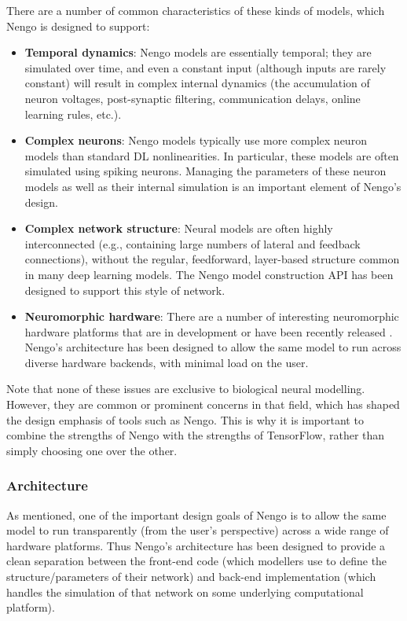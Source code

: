 \documentclass{article}
\begin{document}
There are a number of common characteristics of these kinds of models, which Nengo is designed to support:

\begin{itemize}
\item {\bf Temporal dynamics}: Nengo models are essentially temporal; they are simulated over time, and even a constant input (although inputs are rarely constant) will result in complex internal dynamics (the accumulation of neuron voltages, post-synaptic filtering, communication delays, online learning rules, etc.).
\item {\bf Complex neurons}: Nengo models typically use more complex neuron models than standard DL nonlinearities. In particular, these models are often simulated using spiking neurons.  Managing the parameters of these neuron models as well as their internal simulation is an important element of Nengo's design.
\item {\bf Complex network structure}: Neural models are often highly interconnected (e.g., containing large numbers of lateral and feedback connections), without the regular, feedforward, layer-based structure common in many deep learning models.  The Nengo model construction API has been designed to support this style of network.
\item {\bf Neuromorphic hardware}: There are a number of interesting neuromorphic hardware platforms that are in development or have been recently released \citep[e.g.,][]{Khan2008,Benjamin2014,Davies2018}.  Nengo's architecture has been designed to allow the same model to run across diverse hardware backends, with minimal load on the user.
\end{itemize}

Note that none of these issues are exclusive to biological neural modelling.  However, they are common or prominent concerns in that field, which has shaped the design emphasis of tools such as Nengo.  This is why it is important to combine the strengths of Nengo with the strengths of TensorFlow, rather than simply choosing one over the other.

\subsubsection{Architecture}

As mentioned, one of the important design goals of Nengo is to allow the same model to run transparently (from the user's perspective) across a wide range of hardware platforms.  Thus Nengo's architecture has been designed to provide a clean separation between the front-end code (which modellers use to define the structure/parameters of their network) and back-end implementation (which handles the simulation of that network on some underlying computational platform).  
\end{document}
